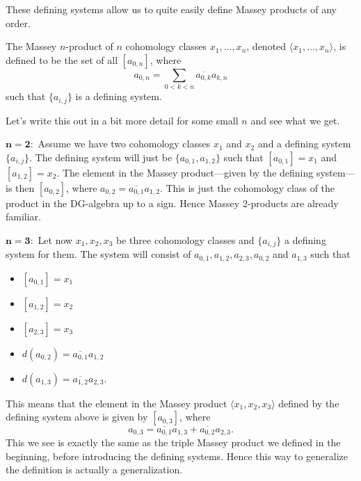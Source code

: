 These defining systems allow us to quite easily define Massey products of any order. 

\begin{definition}
\label{def:massey_product}
The Massey $n$-product of $n$ cohomology classes $x_1, \ldots, x_n$, denoted $\langle x_1, \ldots, x_n\rangle$, is defined to be the set of all $[a_{0,n}]$, where
\begin{equation*}
    a_{0,n} = \sum_{0<k<n}\overline{a_{0, k}}a_{k, n}
\end{equation*}
such that $\{ a_{i,j} \}$ is a defining system.
\end{definition}

Let's write this out in a bit more detail for some small $n$ and see what we get. 

$\mathbf{n=2}:$ Assume we have two cohomology classes $x_1$ and $x_2$ and a defining system $\{a_{i,j} \}$. The defining system will just be $\{ a_{0,1}, a_{1,2}\}$ such that $[a_{0,1}]=x_1$ and  $[a_{1,2}] = x_2$. The element in the Massey product---given by the defining system---is then $[a_{0,2}]$, where $a_{0, 2} = \overline{a_{0, 1}}a_{1, 2}$. This is just the cohomology class of the product in the DG-algebra up to a sign. Hence Massey $2$-products are already familiar. 


$\mathbf{n=3}:$ Let now $x_1, x_2, x_3$ be three cohomology classes and $\{a_{i,j}\}$ a defining system for them. The system will consist of $a_{0,1}, a_{1,2}, a_{2,3}, a_{0,2}$ and $a_{1,3}$ such that 
\begin{itemize}
    \item $[a_{0,1}] = x_1$
    \item $[a_{1,2}] = x_2$
    \item $[a_{2,3}] = x_3$
    \item $d(a_{0,2}) = \overline{a_{0,1}} a_{1,2}$
    \item $d(a_{1,3}) = \overline{a_{1,2}} a_{2,3}$.
\end{itemize}
This means that the element in the Massey product $\langle x_1, x_2, x_3 \rangle$ defined by the defining system above is given by $[a_{0,3}]$, where
\begin{equation*}
    a_{0,3} = \overline{a_{0, 1}}a_{1, 3} + \overline{a_{0, 2}}a_{2, 3}.
\end{equation*}
This we see is exactly the same as the triple Massey product we defined in the beginning, before introducing the defining systems. Hence this way to generalize the definition is actually a generalization. 

